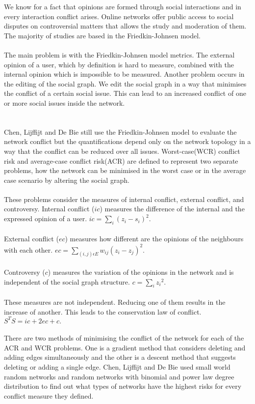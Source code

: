 We know for a fact that opinions are formed through social interactions and in every interaction conflict arises. Online networks offer public access to social disputes on controversial matters that allows the study and moderation of them. The majority of studies are based in the Friedkin-Johnsen model. 
\\
\\
The main problem is with the Friedkin-Johnsen model metrics. The external opinion of a user, which by definition is hard to measure, combined with the internal opinion which is impossible to be measured. Another problem occurs in the editing of the social graph. We edit the social graph in a way that minimises the conflict of a certain social issue. This can lead to an increased conflict of one or more social issues inside the network.
\\
\\
\\
Chen, Lijffijt and De Bie still use the Friedkin-Johnsen model to evaluate the network conflict but the quantifications depend only on the network topology in a way that the conflict can be reduced over all issues. Worst-case(WCR) conflict risk and average-case conflict risk(ACR) are defined to represent two separate problems, how the network can be minimised in the worst case or in the average case scenario by altering the social graph. 
\\
\\
These problems consider the measures of internal conflict, external conflict, and controversy. Internal conflict ($ic$) measures the difference of the internal and the expressed opinion of a user. $ic = \sum_i{(z_i-s_i)^2}.$
\\
\\
 External conflict ($ec$) measures how different are the opinions of the neighbours with each other. $ec = \sum_{(i,j) \epsilon E}{w_{ij}(z_i-z_j)^2}$. 
 \\
 \\
 Controversy ($c$) measures the variation of the opinions in the network and is independent of the social graph structure. $c = \sum_i{z_i}^2.$
 \\ 
 \\
 These measures are not independent. Reducing one of them results in the increase of another. This leads to the conservation law of conflict. $S^TS = ic + 2ec +  c.$ 
 \\
 \\
 There are two methods of minimising the conflict of the network for each of the ACR and WCR problems. One is a gradient method that  considers deleting and adding edges simultaneously and the other is a descent method that suggests deleting or adding a single edge. Chen, Lijffijt and De Bie used small world random networks and random networks with binomial and power law degree distribution to find out what types of networks have the highest risks for every conflict measure they defined. 
